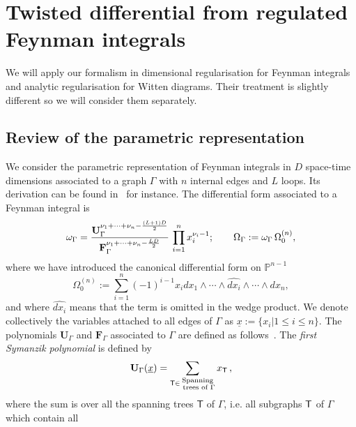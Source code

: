 \documentclass[a4paper,12pt]{article}
\numberwithin{equation}{section}
\numberwithin{figure}{section}
\begin{document}
\section{Twisted differential from regulated Feynman integrals}
\label{sec:parametric}

We will apply our formalism in dimensional regularisation for Feynman integrals and analytic regularisation for Witten diagrams. Their treatment is slightly different so we will consider them separately. 

\subsection{Review of the parametric representation}
We consider the parametric  representation of Feynman
integrals  in $D$ space-time dimensions associated to a graph $\Gamma$ with $n$   internal edges and $L$ loops. Its derivation can be found  in~\cite{nakanishi1971graph,Vanhove:2014wqa,Bogner:2010kv,Weinzierl:2022eaz} for instance. 
%
The differential form associated to a Feynman integral is 
\begin{equation}\label{e:OmegaDef}
	\omega_\Gamma ={ \textbf{U}_\Gamma ^{\nu_1+\cdots+\nu_n-{(L+1)D\over2}}  \over
  \textbf{F}_\Gamma ^{\nu_1+\cdots+\nu_n-{LD\over2}} }\, \prod_{i=1}^n
x_i^{\nu_i-1}; \qquad 	\Omega_\Gamma :=	\omega_\Gamma \, \Omega^{(n)}_0,
\end{equation}
where we have introduced the  canonical differential form on
$\mathbb P^{n-1}$ 
% 
\begin{equation}
	\Omega_0^{(n)}:=  \sum_{i=1}^n (-1)^{i-1} x_i dx_1\wedge \cdots \wedge \widehat{dx_i} \wedge\cdots \wedge dx_n ,
\end{equation}
and where  $\widehat{dx_i}$ means that the term is omitted in the wedge
product. We denote collectively the 
variables 
attached to all edges of
$\Gamma$ as $\underline x:=\{x_i |1\leq i\leq n\}$. 
%
The polynomials $\textbf{U}_\Gamma$ and $\textbf{F}_\Gamma$
associated to  $\Gamma$ are defined as
follows~\cite{nakanishi1971graph,Bogner:2010kv,Weinzierl:2022eaz}.  The {\em first
	Symanzik polynomial} is defined by
\begin{equation}\label{e:Udef}
	{\bf U}_\Gamma (\underline x)= \sum_{\mathsf{T} \in \substack{ \text{Spanning} \\ \text{ trees of } \Gamma}} x_{\mathsf{T}}\,, 
\end{equation}
where the sum is over all the spanning trees $\mathsf{T}$ of $\Gamma$,  i.e.  all subgraphs ${\sf T}$ of $\Gamma$ which contain all
\end{document}

